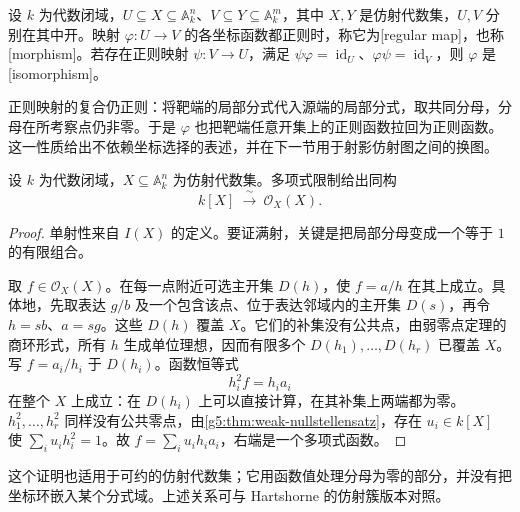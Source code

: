 \begin{definition}\label{g5:def:affine-morphism}
	设 \(k\) 为代数闭域，\(U\subseteq X\subseteq\mathbb A_k^n\)、\(V\subseteq Y\subseteq\mathbb A_k^m\)，其中 \(X,Y\) 是仿射代数集，\(U,V\) 分别在其中开。映射 \(\varphi:U\rightarrow V\) 的各坐标函数都正则时，称它为[regular map]，也称[morphism]。若存在正则映射 \(\psi:V\rightarrow U\)，满足 \(\psi\varphi=\operatorname{id}_U\)、\(\varphi\psi=\operatorname{id}_V\)，则 \(\varphi\) 是[isomorphism]。
\end{definition}

正则映射的复合仍正则：将靶端的局部分式代入源端的局部分式，取共同分母，分母在所考察点仍非零。于是 \(\varphi\) 也把靶端任意开集上的正则函数拉回为正则函数。这一性质给出不依赖坐标选择的表述，并在下一节用于射影仿射图之间的换图。

\begin{theorem}\label{g5:thm:affine-global-functions}
	设 \(k\) 为代数闭域，\(X\subseteq\mathbb A_k^n\) 为仿射代数集。多项式限制给出同构
	\[
		k[X]\ \xrightarrow{\ \sim\ }\ \mathcal O_X(X).
	\]
\end{theorem}
\begin{proof}
	单射性来自 \(I(X)\) 的定义。要证满射，关键是把局部分母变成一个等于 \(1\) 的有限组合。

	取 \(f\in\mathcal O_X(X)\)。在每一点附近可选主开集 \(D(h)\)，使 \(f=a/h\) 在其上成立。具体地，先取表达 \(g/b\) 及一个包含该点、位于表达邻域内的主开集 \(D(s)\)，再令 \(h=sb\)、\(a=sg\)。这些 \(D(h)\) 覆盖 \(X\)。它们的补集没有公共点，由弱零点定理的商环形式，所有 \(h\) 生成单位理想，因而有限多个 \(D(h_1),\ldots,D(h_r)\) 已覆盖 \(X\)。写 \(f=a_i/h_i\) 于 \(D(h_i)\)。函数恒等式
	\[
		h_i^2f=h_i a_i
	\]
	在整个 \(X\) 上成立：在 \(D(h_i)\) 上可以直接计算，在其补集上两端都为零。\(h_1^2,\ldots,h_r^2\) 同样没有公共零点，由\cref{g5:thm:weak-nullstellensatz}，存在 \(u_i\in k[X]\) 使 \(\sum_i u_i h_i^2=1\)。故 \(f=\sum_i u_i h_i a_i\)，右端是一个多项式函数。
\end{proof}

这个证明也适用于可约的仿射代数集；它用函数值处理分母为零的部分，并没有把坐标环嵌入某个分式域。上述关系可与 Hartshorne 的仿射簇版本对照\cite[第I章第3节，定理3.2]{Hartshorne1977}。

